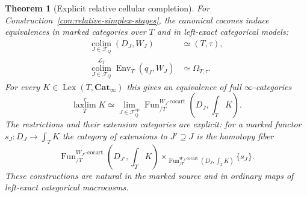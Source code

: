 \documentclass[oneside]{article}
\theoremstyle{plain}
\newtheorem{theorem}{Theorem}[section]
\theoremstyle{definition}
\theoremstyle{remark}
\newcommand{\Cat}{\mathbf{Cat}_{\infty}}
\newcommand{\Env}{\operatorname{Env}}
\newcommand{\Fun}{\operatorname{Fun}}
\newcommand{\Lex}{\operatorname{Lex}}
\newcommand{\coc}{\mathrm{cocart}}
\newcommand{\op}{\mathrm{op}}
\begin{document}
\begin{theorem}[Explicit relative cellular completion]
\label{thm:relative-cellular-completion}
For Construction~\ref{con:relative-simplex-stages}, the canonical
cocones induce equivalences in marked categories over $T$ and in
left-exact categorical models:
\begin{align}
 \operatorname*{colim}_{J\in\mathcal F_Q}(D_J,W_J)
 &\simeq(T,\tau),\label{eq:relative-stage-colim}\\
 \operatorname*{colim}_{J\in\mathcal F_Q}^{\mathcal L_T}
       \Env_T(q_J,W_J)
 &\simeq\Omega_{T,\tau}.\label{eq:relative-env-colim}
\end{align}
For every $K\in\Lex(T,\Cat)$ this gives an equivalence of full
$\infty$-categories
\begin{equation}\label{eq:relative-stage-internal-lim}
 \operatorname*{laxlim}_T^\tau K
 \simeq
 \lim_{J\in\mathcal F_Q^{\op}}
 \Fun^{W_J\text{-}\coc}_{/T}(D_J,\textstyle\int_TK).
\end{equation}
The restrictions and their extension categories are explicit: for a
marked functor $s_J:D_J\to\int_TK$ the category of extensions to
$J'\supseteq J$ is the homotopy fiber
\begin{equation}\label{eq:relative-stage-extension}
 \Fun^{W_{J'}\text{-}\coc}_{/T}
 (D_{J'},\textstyle\int_TK)
 \times_{\Fun^{W_J\text{-}\coc}_{/T}(D_J,\int_TK)}\{s_J\}.
\end{equation}
These constructions are natural in the marked source and in ordinary
maps of left-exact categorical macrocosms.
\end{theorem}
\end{document}
